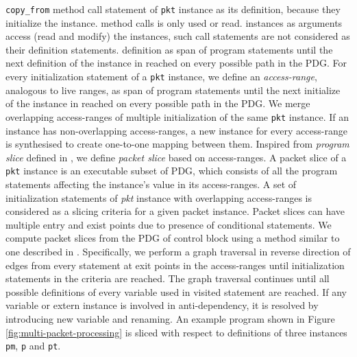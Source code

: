\documentclass[letterpaper,twocolumn,10pt]{article}
\begin{document}
\texttt{copy\_from} method call statement of \texttt{pkt} instance as 
its definition, because they initialize the instance.
method calls is only used or read.
instances as arguments access (read and modify) the instances, such 
call statements are not considered as their definition statements.
definition as span of program statements until the next definition of 
the instance in reached on every possible path in the PDG.
For every initialization statement of a \texttt{pkt} instance, we 
define an \emph{access-range}, analogous to live ranges, as span of 
program statements until the next initialize of the instance in 
reached on every possible path in the PDG.
We merge overlapping access-ranges of multiple initialization of the 
same \texttt{pkt} instance.
If an instance has non-overlapping access-ranges, a new instance for 
every access-range is synthesised to create one-to-one mapping between 
them.
Inspired from \emph{program slice} defined in 
\cite{Weiser:1981:PS:800078.802557}, we define \emph{packet slice} 
based on access-ranges.
A packet slice of a \texttt{pkt} instance is an executable subset of 
PDG, which consists of all the program statements affecting the 
instance's value in its access-ranges.
A set of initialization statements of \emph{pkt} instance with 
overlapping access-ranges is considered as a slicing criteria for a 
given packet instance.
Packet slices can have multiple entry and exist points due to presence 
of conditional statements.
We compute packet slices from the PDG of control block using a method 
similar to one described in \cite{Ferrante:1987:PDG:24039.24041}.
Specifically, we perform a graph traversal in reverse direction of 
edges from every statement at exit points in the access-ranges until 
initialization statements in the criteria are reached.
The graph traversal continues until all possible definitions of every 
variable used in visited statement are reached.
If any variable or extern instance is involved in anti-dependency, it 
is resolved by introducing new variable and renaming.
An example program shown in Figure \ref{fig:multi-packet-processing} 
is sliced with respect to definitions of three instances \texttt{pm}, 
\texttt{p} and \texttt{pt}.
\end{document}
